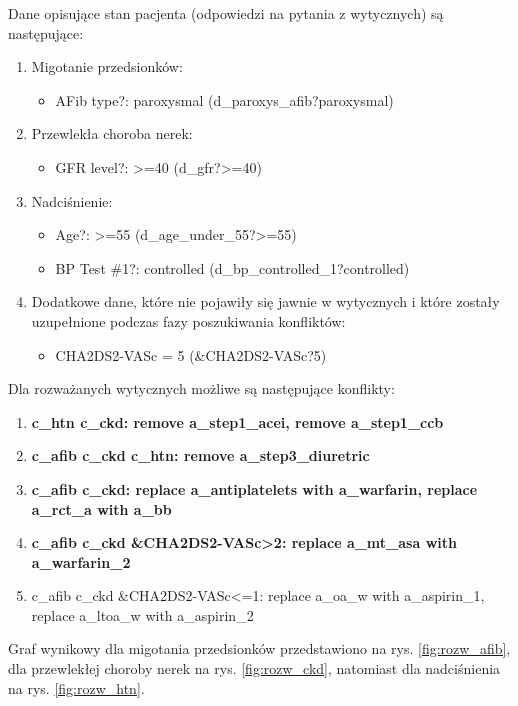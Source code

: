 Dane opisujące stan pacjenta (odpowiedzi na pytania z wytycznych) są następujące:
\begin{enumerate}
\item{Migotanie przedsionków:
	\begin{itemize}
	\item{AFib type?: paroxysmal (d\_paroxys\_afib?paroxysmal)}
	\end{itemize}
}
\item{Przewlekła choroba nerek:
	\begin{itemize}
	\item{GFR level?: >=40 (d\_gfr?>=40)}
	\end{itemize}
}
\item{Nadciśnienie:
	\begin{itemize}
	\item{Age?: >=55 (d\_age\_under\_55?>=55)}
	\item{BP Test \#1?: controlled (d\_bp\_controlled\_1?controlled)}
	\end{itemize}
}
\item Dodatkowe dane, które nie pojawiły się jawnie w wytycznych i które zostały uzupełnione podczas fazy poszukiwania konfliktów:
	\begin{itemize}
	\item{CHA2DS2-VASc = 5 (\&CHA2DS2-VASc?5)}
	\end{itemize}
\end{enumerate}

Dla rozważanych wytycznych możliwe są następujące konflikty:
\begin{enumerate}
\item \textbf{c\_htn c\_ckd: remove a\_step1\_acei, remove a\_step1\_ccb}
\item \textbf{c\_afib c\_ckd c\_htn: remove a\_step3\_diuretric}
\item \textbf{c\_afib c\_ckd: replace a\_antiplatelets with a\_warfarin, replace a\_rct\_a with a\_bb}
\item \textbf{c\_afib c\_ckd \&CHA2DS2-VASc>2: replace a\_mt\_asa with a\_warfarin\_2}
\item c\_afib c\_ckd \&CHA2DS2-VASc<=1: replace a\_oa\_w with a\_aspirin\_1, replace a\_ltoa\_w with a\_aspirin\_2
\end{enumerate}

Graf wynikowy dla migotania przedsionków przedstawiono na rys. \ref{fig:rozw_afib}, dla przewlekłej choroby nerek na rys. \ref{fig:rozw_ckd}, natomiast dla nadciśnienia na rys. \ref{fig:rozw_htn}.

